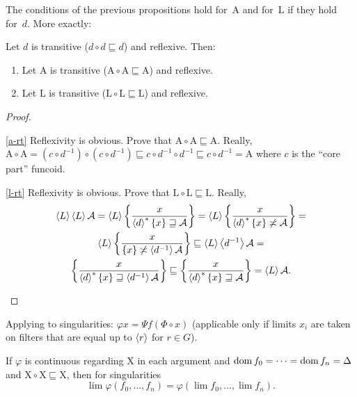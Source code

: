 \begin{prop}
The conditions of the previous propositions hold for~$\mathrm{A}$ and for~$\mathrm{L}$ if they hold for~$d$. More exactly:

Let $d$ is transitive ($d \circ d \sqsubseteq d$) and reflexive. Then:
\begin{enumerate}
\item\label{a-rt} Let $\mathrm{A}$ is transitive ($\mathrm{A} \circ \mathrm{A} \sqsubseteq \mathrm{A}$) and reflexive.
\item\label{l-rt} Let $\mathrm{L}$ is transitive ($\mathrm{L} \circ \mathrm{L} \sqsubseteq \mathrm{L}$) and reflexive.
\end{enumerate}
\end{prop}

\begin{proof}
~
\begin{disorder}
\item[\ref{a-rt}] Reflexivity is obvious. Prove that $\mathrm{A} \circ \mathrm{A} \sqsubseteq \mathrm{A}$. Really,
$\mathrm{A} \circ \mathrm{A} = (c\circ d^{-1})\circ(c\circ d^{-1}) \sqsubseteq c\circ d^{-1}\circ d^{-1} \sqsubseteq c\circ d^{-1} = \mathrm{A}$ where $c$ is the ``core part'' funcoid.

\item[\ref{l-rt}] Reflexivity is obvious. Prove that $\mathrm{L} \circ \mathrm{L} \sqsubseteq \mathrm{L}$. Really,
\begin{multline*}
\left\langle L\right\rangle\left\langle L\right\rangle\mathcal{A}=
\left\langle L\right\rangle\left\{ \frac{x}{\left\langle d\right\rangle ^{\ast}\{x\}\sqsupseteq\mathcal{A}}\right\}=
\left\langle L\right\rangle\left\{ \frac{x}{\left\langle d\right\rangle ^{\ast}\{x\}\not\asymp\mathcal{A}}\right\}= \\
\left\langle L\right\rangle\left\{ \frac{x}{\{x\}\not\asymp\left\langle d^{-1}\right\rangle\mathcal{A}}\right\}
\sqsubseteq
\left\langle L\right\rangle\left\langle d^{-1}\right\rangle\mathcal{A} = \\
\left\{ \frac{x}{\left\langle d\right\rangle ^{\ast}\{x\}\sqsupseteq\left\langle d^{-1}\right\rangle\mathcal{A}}\right\}\sqsubseteq
\left\{ \frac{x}{\left\langle d\right\rangle ^{\ast}\{x\}\sqsupseteq\mathcal{A}}\right\} =
\left\langle L\right\rangle\mathcal{A}.
\end{multline*}
\end{disorder}
\end{proof}

\begin{defn}
  Applying to singularities: $\varphi x = \Psi f (\Phi \circ x)$ (applicable only if limits $x_i$ are taken on filters that are
  equal up to $\left\langle r\right\rangle$ for $r \in G$).
\end{defn}

\begin{thm}
  If $\varphi$ is continuous regarding $\mathrm{X}$ in each argument and $\operatorname{dom} f_0
  = \cdots = \operatorname{dom} f_n = \Delta$ and $\mathrm{X} \circ \mathrm{X} \sqsubseteq \mathrm{X}$, then for singularities
\[ \lim \varphi (f_0, \ldots, f_n) = \varphi (\lim f_0, \ldots, \lim f_n). \]
\end{thm}

